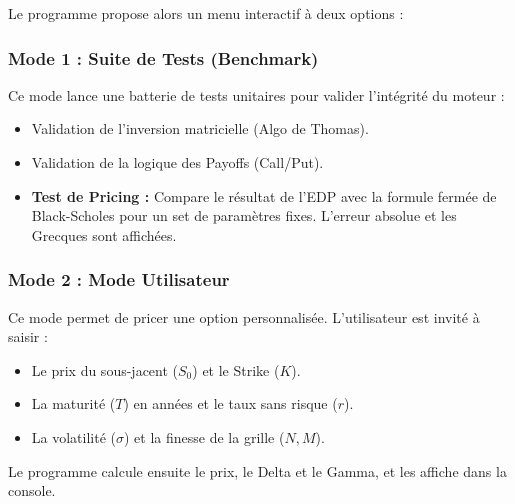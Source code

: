 \documentclass[a4paper,12pt]{article}
\begin{document}
Le programme propose alors un menu interactif à deux options :

\subsubsection{Mode 1 : Suite de Tests (Benchmark)}
Ce mode lance une batterie de tests unitaires pour valider l'intégrité du moteur :
\begin{itemize}
    \item Validation de l'inversion matricielle (Algo de Thomas).
    \item Validation de la logique des Payoffs (Call/Put).
    \item \textbf{Test de Pricing :} Compare le résultat de l'EDP avec la formule fermée de Black-Scholes pour un set de paramètres fixes. L'erreur absolue et les Grecques sont affichées.
\end{itemize}

\subsubsection{Mode 2 : Mode Utilisateur}
Ce mode permet de pricer une option personnalisée. L'utilisateur est invité à saisir :
\begin{itemize}
    \item Le prix du sous-jacent ($S_0$) et le Strike ($K$).
    \item La maturité ($T$) en années et le taux sans risque ($r$).
    \item La volatilité ($\sigma$) et la finesse de la grille ($N, M$).
\end{itemize}
Le programme calcule ensuite le prix, le Delta et le Gamma, et les affiche dans la console.
\end{document}
